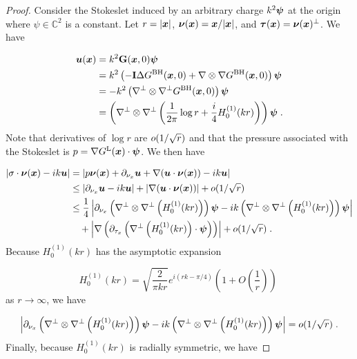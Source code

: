 \begin{proof}
Consider the Stokeslet induced by an arbitrary charge
$k^2 {\boldsymbol \psi}$ at the origin where $\psi \in \mathbb{C}^2$ 
is a constant. Let $r = |{\boldsymbol x}|$,
${\boldsymbol \nu}({\boldsymbol x}) = {\boldsymbol x}/|{\boldsymbol x}|$, and ${\boldsymbol \tau}({\boldsymbol x}) = {\boldsymbol \nu}({\boldsymbol x})^\perp$. We have

\begin{align*}
{\boldsymbol u} ({\boldsymbol x}) &= k^2 {\bf G}({\boldsymbol x},0) {\boldsymbol \psi} \\
&= k^2 \left (-{\bf I} \Delta G^{\textrm{BH}}({\boldsymbol x},0)
+ \nabla \otimes \nabla G^{\textrm{BH}}({\boldsymbol x},0)\right ) {\boldsymbol \psi} \\
&= -k^2 \left (\nabla^\perp \otimes \nabla^\perp G^{\textrm{BH}}({\boldsymbol x},0) \right) {\boldsymbol \psi} \\
&= \left(\nabla^\perp \otimes \nabla^\perp \left ( \frac{1}{2\pi}
\log r + \frac{i}{4} H_0^{(1)} (kr) \right ) \right){\boldsymbol \psi} \; .
\end{align*}
Note that derivatives of $\log r$ are $o (1/\sqrt{r})$
and that the pressure associated with the Stokeslet is
$p = \nabla G^{\textrm{L}}({\boldsymbol x}) \cdot {\boldsymbol \psi}$. We then have

\begin{align*}
\left | \sigma \cdot {\boldsymbol \nu}({\boldsymbol x}) - i k {\boldsymbol u} \right | &=
\left | p {\boldsymbol \nu}({\boldsymbol x}) + \partial_{{\nu_x}} {\boldsymbol u} + \nabla ({\boldsymbol u} \cdot {\boldsymbol \nu}({\boldsymbol x}))
- ik {\boldsymbol u} \right | \\
&\leq \left | \partial_{{\nu_x}} {\boldsymbol u} - ik{\boldsymbol u} \right | + \left | \nabla({\boldsymbol u} \cdot {\boldsymbol \nu}({\boldsymbol x})) \right |
+ o (1/\sqrt{r}) \\
&\leq \frac{1}{4} \left | \partial_{{\nu_x}} \left(\nabla^\perp \otimes
\nabla^\perp \left (H_0^{(1)} (kr) \right ) \right){\boldsymbol \psi}
- i k \left(\nabla^\perp \otimes \nabla^\perp
\left (H_0^{(1)} (kr) \right ) \right){\boldsymbol \psi} \right | \\
& \quad + \left | \nabla \left( \partial_{\tau_x} \left ( 
\nabla^\perp \left (H_0^{(1)} (kr) \right ) \cdot {\boldsymbol \psi}  \right )
\right) \right | + o (1/\sqrt{r}) \; .
\end{align*}
Because $H_0^{(1)}(kr)$ has the asymptotic expansion 

\begin{equation}
H_0^{(1)}(kr) = \sqrt{\frac{2}{\pi k r}} e^{i(rk-\pi/4)} \left ( 1 + O\left (
\frac{1}{r} \right ) \right ) \; \nonumber
\end{equation}
as $r\to \infty$, we have

\begin{equation}
\left | \partial_{{\nu_x}} \left(\nabla^\perp \otimes
\nabla^\perp \left (H_0^{(1)} (kr) \right ) \right){\boldsymbol \psi}
- ik \left(\nabla^\perp \otimes \nabla^\perp
\left (H_0^{(1)} (kr) \right ) \right){\boldsymbol \psi} \right | =
o ( 1/\sqrt{r} ) \; . \nonumber
\end{equation}
Finally, because $H_0^{(1)}(kr)$ is radially symmetric,
we have


\end{proof}

